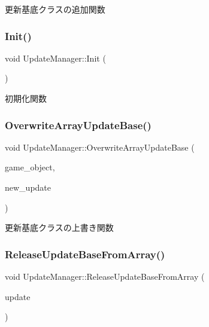 更新基底クラスの追加関数 

\mbox{\label{class_update_manager_a7b0a2a3bf51d4fcb83fd25fe642fc66b}} 
\subsubsection{\texorpdfstring{Init()}{Init()}}
{\footnotesize\ttfamily void Update\+Manager\+::\+Init (\begin{DoxyParamCaption}{ }\end{DoxyParamCaption})}



初期化関数 

\mbox{\label{class_update_manager_ab4f492c33ed941ddd01ccae8218080ff}} 
\subsubsection{\texorpdfstring{Overwrite\+Array\+Update\+Base()}{OverwriteArrayUpdateBase()}}
{\footnotesize\ttfamily void Update\+Manager\+::\+Overwrite\+Array\+Update\+Base (\begin{DoxyParamCaption}\item[{\mbox{\hyperlink{class_game_object_base}{Game\+Object\+Base}} $\ast$}]{game\+\_\+object,  }\item[{\mbox{\hyperlink{class_update_base}{Update\+Base}} $\ast$}]{new\+\_\+update }\end{DoxyParamCaption})}



更新基底クラスの上書き関数 

\mbox{\label{class_update_manager_a8a54226896f4280b589af85c07e869d9}} 
\subsubsection{\texorpdfstring{Release\+Update\+Base\+From\+Array()}{ReleaseUpdateBaseFromArray()}}
{\footnotesize\ttfamily void Update\+Manager\+::\+Release\+Update\+Base\+From\+Array (\begin{DoxyParamCaption}\item[{\mbox{\hyperlink{class_update_base}{Update\+Base}} $\ast$}]{update }\end{DoxyParamCaption})}




